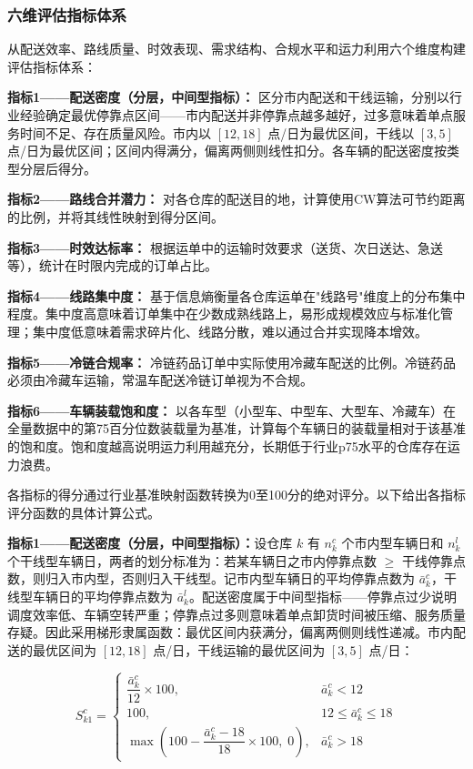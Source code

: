 \subsubsection{六维评估指标体系}

从配送效率、路线质量、时效表现、需求结构、合规水平和运力利用六个维度构建评估指标体系：

\textbf{指标1——配送密度（分层，中间型指标）：} 区分市内配送和干线运输，分别以行业经验确定最优停靠点区间——市内配送并非停靠点越多越好，过多意味着单点服务时间不足、存在质量风险。市内以 $[12, 18]$ 点/日为最优区间，干线以 $[3, 5]$ 点/日为最优区间；区间内得满分，偏离两侧则线性扣分。各车辆的配送密度按类型分层后得分。

\textbf{指标2——路线合并潜力：} 对各仓库的配送目的地，计算使用CW算法可节约距离的比例，并将其线性映射到得分区间。

\textbf{指标3——时效达标率：} 根据运单中的运输时效要求（送货、次日送达、急送等），统计在时限内完成的订单占比。

\textbf{指标4——线路集中度：} 基于信息熵衡量各仓库运单在"线路号"维度上的分布集中程度。集中度高意味着订单集中在少数成熟线路上，易形成规模效应与标准化管理；集中度低意味着需求碎片化、线路分散，难以通过合并实现降本增效。

\textbf{指标5——冷链合规率：} 冷链药品订单中实际使用冷藏车配送的比例。冷链药品必须由冷藏车运输，常温车配送冷链订单视为不合规。

\textbf{指标6——车辆装载饱和度：} 以各车型（小型车、中型车、大型车、冷藏车）在全量数据中的第75百分位数装载量为基准，计算每个车辆日的装载量相对于该基准的饱和度。饱和度越高说明运力利用越充分，长期低于行业p75水平的仓库存在运力浪费。

各指标的得分通过行业基准映射函数转换为0至100分的绝对评分。以下给出各指标评分函数的具体计算公式。

{\bf 指标1——配送密度（分层，中间型指标）：}设仓库 $k$ 有 $n_k^c$ 个市内型车辆日和 $n_k^l$ 个干线型车辆日，两者的划分标准为：若某车辆日之市内停靠点数 $\geq$ 干线停靠点数，则归入市内型，否则归入干线型。记市内型车辆日的平均停靠点数为 $\bar{a}_k^c$，干线型车辆日的平均停靠点数为 $\bar{a}_k^l$。配送密度属于中间型指标——停靠点过少说明调度效率低、车辆空转严重；停靠点过多则意味着单点卸货时间被压缩、服务质量存疑。因此采用梯形隶属函数：最优区间内获满分，偏离两侧则线性递减。市内配送的最优区间为 $[12, 18]$ 点/日，干线运输的最优区间为 $[3, 5]$ 点/日：


\begin{equation}\label{eq:score_s1_city}
S_{k1}^c = \begin{cases}
\dfrac{\bar{a}_k^c}{12} \times 100, & \bar{a}_k^c < 12\\
100, & 12 \leq \bar{a}_k^c \leq 18\\
\max\!\left(100 - \dfrac{\bar{a}_k^c - 18}{18} \times 100,\; 0\right), & \bar{a}_k^c > 18
\end{cases}
\end{equation}

